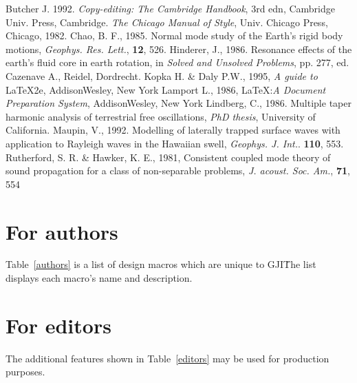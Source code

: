 \begin{thebibliography}{}
    Butcher J. 1992. \textit{Copy-editing: The Cambridge Handbook}, 3rd edn,
    Cambridge Univ. Press, Cambridge.
   \textit{The Chicago Manual of Style}, Univ. Chicago Press,
    Chicago, 1982.
    Chao, B. F., 1985. Normal mode study of the Earth's rigid body motions,
    \textit{Geophys. Res. Lett.}, \textbf{12}, 526.
    Hinderer, J., 1986. Resonance effects of the earth's fluid core in earth
    rotation, in \textit{Solved and Unsolved Problems}, pp. 277,
    ed. Cazenave A., Reidel, Dordrecht.
    Kopka H. \& Daly P.W., 1995, \textit{A guide to} \LaTeX2e,
    Addison\textendash{}Wesley, New York
    Lamport L., 1986, \LaTeX:\textit{A Document Preparation System},
    Addison\textendash{}Wesley, New York
    Lindberg, C., 1986. Multiple taper harmonic analysis of terrestrial free
    oscillations, \textit{PhD thesis}, University of California.
    Maupin, V., 1992. Modelling of laterally trapped surface waves with
    application to Rayleigh waves in the Hawaiian swell, \textit{Geophys. J.
    Int.}. \textbf{110}, 553.
    Rutherford, S. R. \& Hawker, K. E., 1981, Consistent coupled mode
    theory of sound propagation for a class of non-separable problems,
   \textit{J. acoust. Soc. Am.}, \textbf{71}, 554
\end{thebibliography}


\appendix
\section{For authors}

Table~\ref{authors} is a list of design macros which are unique to GJI\. The
list displays each macro's name and description.

\section{For editors}

The additional features shown in Table~\ref{editors} may be used for production
purposes.

\bsp{} %
~\label{lastpage}

